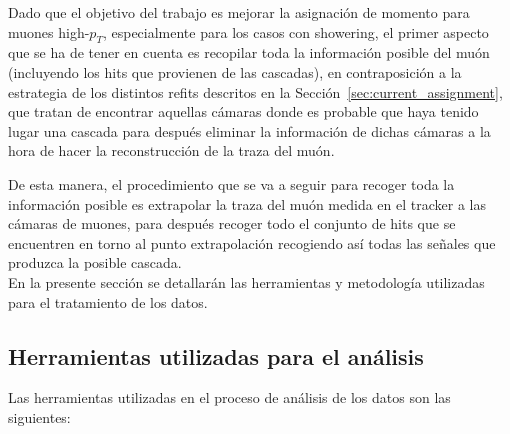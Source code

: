 
Dado que el objetivo del trabajo es mejorar la asignaci\'on de momento para muones high-$p_{T}$, especialmente para los casos con showering, el primer aspecto que se ha de tener en cuenta es recopilar toda la informaci\'on posible del mu\'on (incluyendo los hits que provienen de las cascadas), en contraposici\'on a la estrategia de los distintos refits descritos en la Secci\'on~\ref{sec:current_assignment}, que tratan de encontrar aquellas c\'amaras donde es probable que haya tenido lugar una cascada para despu\'es eliminar la informaci\'on de dichas c\'amaras a la hora de hacer la reconstrucci\'on de la traza del mu\'on.

De esta manera, el procedimiento que se va a seguir para recoger toda la informaci\'on posible es extrapolar la traza del mu\'on medida en el tracker a las c\'amaras de muones, para despu\'es recoger todo el conjunto de hits que se encuentren en torno al punto extrapolaci\'on recogiendo as\'i todas las se\~nales que produzca la posible cascada. \\

En la presente secci\'on se detallar\'an las herramientas y metodolog\'ia utilizadas para el tratamiento de los datos.


\subsection{Herramientas utilizadas para el an\'alisis}\label{sec:tools}

Las herramientas utilizadas en el proceso de an\'alisis de los datos son las siguientes:

